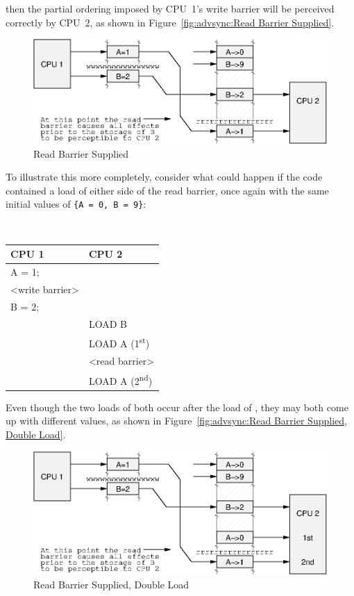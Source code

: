 then the partial ordering imposed by CPU~1's write barrier will be
perceived correctly by CPU~2, as shown in
Figure~\ref{fig:advsync:Read Barrier Supplied}.

\begin{figure}[htb]
\centering
\includegraphics{advsync/ReadBarrierSupplied}
\caption{Read Barrier Supplied}
\end{figure}

To illustrate this more completely, consider what could happen if the code
contained a load of  either side of the read barrier, once again
with the same initial values of
{\tt \{A = 0, B = 9\}}:

\vspace{5pt}
\begin{minipage}[t]{\columnwidth}
\tt
\scriptsize
\begin{tabular}{l|p{1.5in}}
	CPU 1 &		CPU 2 \\
	\hline
	A = 1; & \\
	<write barrier> & \\
	B = 2; & \\
		&	LOAD B \\
		&	LOAD A (1\textsuperscript{st}) \\
		&	<read barrier> \\
		&	LOAD A (2\textsuperscript{nd}) \\
\end{tabular}
\end{minipage}
\vspace{5pt}

Even though the two loads of 
both occur after the load of , they may both
come up with different values, as shown in
Figure~\ref{fig:advsync:Read Barrier Supplied, Double Load}.

\begin{figure}[htb]
\centering
\includegraphics{advsync/ReadBarrierSupplied1}
\caption{Read Barrier Supplied, Double Load}
\end{figure}

